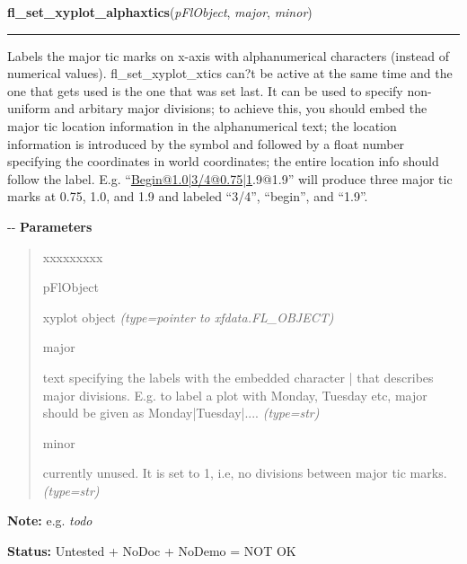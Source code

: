     \vspace{0.5ex}

\hspace{.8\funcindent}\begin{boxedminipage}{\funcwidth}

    \raggedright \textbf{fl\_set\_xyplot\_alphaxtics}(\textit{pFlObject}, \textit{major}, \textit{minor})

    \vspace{-1.5ex}

    \rule{\textwidth}{0.5\fboxrule}
\setlength{\parskip}{2ex}

Labels the major tic marks on x-axis with alphanumerical characters
(instead of numerical values). fl\_set\_xyplot\_xtics can?t be active at the
same time and the one that gets used is the one that was set last. It can
be used to specify non-uniform and arbitary major divisions; to achieve
this, you should embed the major tic location information in the
alphanumerical text; the location information is introduced by the symbol
and followed by a float number specifying the coordinates in world
coordinates; the entire location info should follow the label. E.g.
``\href{mailto:Begin@1.0|3}{Begin@1.0|3}\href{mailto:/4@0.75|1}{/4@0.75|1}.9@1.9'' will produce three major tic marks at 0.75,
1.0, and 1.9 and labeled ``3/4'', ``begin'', and ``1.9''.

-{}-
\setlength{\parskip}{1ex}
      \textbf{Parameters}
      \vspace{-1ex}

      \begin{quote}
        \begin{Ventry}{xxxxxxxxx}

          \item[pFlObject]


xyplot object
            {\it (type=pointer to xfdata.FL\_OBJECT)}

          \item[major]


text specifying the labels with the embedded character | that
describes major divisions. E.g. to label a plot with Monday, Tuesday
etc, major should be given as Monday|Tuesday|....
            {\it (type=str)}

          \item[minor]


currently unused. It is set to 1, i.e, no divisions between major tic
marks.
            {\it (type=str)}

        \end{Ventry}

      \end{quote}

\textbf{Note:} 
e.g. \emph{todo}


\textbf{Status:} 
Untested + NoDoc + NoDemo = NOT OK


    \end{boxedminipage}

